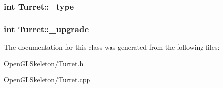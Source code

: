 \subsubsection[{\texorpdfstring{\+\_\+type}{_type}}]{\setlength{\rightskip}{0pt plus 5cm}int Turret\+::\+\_\+type}\hypertarget{class_turret_a53bde4ee8aab3c1e2733445bfe26fb22}{}\label{class_turret_a53bde4ee8aab3c1e2733445bfe26fb22}
\subsubsection[{\texorpdfstring{\+\_\+upgrade}{_upgrade}}]{\setlength{\rightskip}{0pt plus 5cm}int Turret\+::\+\_\+upgrade}\hypertarget{class_turret_a9af84b28b71291fd780c2959d331532d}{}\label{class_turret_a9af84b28b71291fd780c2959d331532d}


The documentation for this class was generated from the following files\+:\begin{DoxyCompactItemize}
\item 
Open\+G\+L\+Skeleton/\hyperlink{_turret_8h}{Turret.\+h}\item 
Open\+G\+L\+Skeleton/\hyperlink{_turret_8cpp}{Turret.\+cpp}\end{DoxyCompactItemize}
